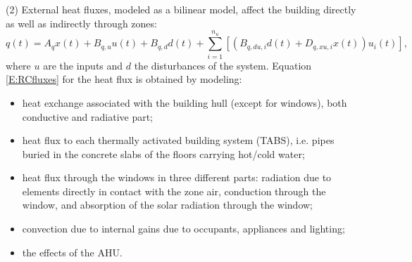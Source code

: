 \textcolor[rgb]{0,0,1}{(2) External heat fluxes, modeled as a bilinear model, affect the building directly as well as indirectly through zones:
		\begin{equation}\label{E:RCfluxes}
			q(t) = A_q x(t) + B_{q,u}u(t) + B_{q,d}d(t) + \sum_{i=1}^{n_u}{[\left(B_{q,du,i}d(t) + D_{q,xu,i}x(t)\right)u_i(t)]},
		\end{equation}
		where $u$ are the inputs and $d$ the disturbances of the system.
Equation \eqref{E:RCfluxes} for the heat flux is obtained by modeling:
	\begin{itemize}
		\item heat exchange associated with the building hull (except for windows), both conductive and radiative part;
		\item  heat flux to each thermally activated building system (TABS), i.e. pipes buried in the concrete slabs of the floors carrying hot/cold water;
		\item heat flux through the windows in three different parts: radiation due to elements directly in contact with the zone air, conduction through the window, and absorption of the solar radiation through the window;
		\item convection due to internal gains due to occupants, appliances and lighting;
		\item the effects of the AHU.
	\end{itemize}
}

